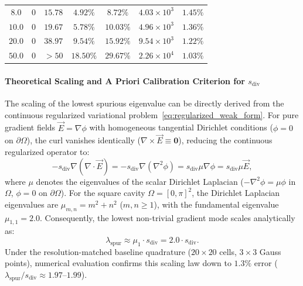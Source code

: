 \documentclass[preprint,12pt]{elsarticle}
\begin{document}
\begin{table}[!htbp]
{\begin{tabular}{@{} c c c c c c c @{}}
            $8.0$              & $0$                         & $15.78$                                         & $4.92\%$                                        & $8.72\%$                                     & $4.03 \times 10^3$              & $1.45\%$               \\
            $10.0$             & $0$                         & $19.67$                                         & $5.78\%$                                        & $10.03\%$                                    & $4.96 \times 10^3$              & $1.36\%$               \\
            $20.0$             & $0$                         & $38.97$                                         & $9.54\%$                                        & $15.92\%$                                    & $9.54 \times 10^3$              & $1.22\%$               \\
            $50.0$             & $0$                         & $> 50$                                          & $18.50\%$                                       & $29.67\%$                                    & $2.26 \times 10^4$              & $1.03\%$               \\
            \bottomrule
        \end{tabular}%
    }
\end{table}

\paragraph{Theoretical Scaling and A Priori Calibration Criterion for $s_{\mathrm{div}}$}
The scaling of the lowest spurious eigenvalue can be directly derived from the continuous regularized variational problem~\eqref{eq:regularized_weak_form}. For pure gradient fields $\vec{E} = \nabla\phi$ with homogeneous tangential Dirichlet conditions ($\phi = 0$ on $\partial\Omega$), the curl vanishes identically ($\nabla \times \vec{E} \equiv \mathbf{0}$), reducing the continuous regularized operator to:
\begin{equation}
    -s_{\mathrm{div}}\nabla(\nabla \cdot \vec{E}) = -s_{\mathrm{div}}\nabla(\nabla^2\phi) = s_{\mathrm{div}}\mu \nabla\phi = s_{\mathrm{div}}\mu \vec{E},
    \label{eq:analytical_spurious_scaling}
\end{equation}
where $\mu$ denotes the eigenvalues of the scalar Dirichlet Laplacian ($-\nabla^2\phi = \mu\phi$ in $\Omega$, $\phi=0$ on $\partial\Omega$). For the square cavity $\Omega = [0, \pi]^2$, the Dirichlet Laplacian eigenvalues are $\mu_{m,n} = m^2 + n^2$ ($m,n \ge 1$), with the fundamental eigenvalue $\mu_{1,1} = 2.0$. Consequently, the lowest non-trivial gradient mode scales analytically as:
\begin{equation}
    \lambda_{\mathrm{spur}} \approx \mu_1 \cdot s_{\mathrm{div}} = 2.0 \cdot s_{\mathrm{div}}.
    \label{eq:spurious_eigenvalue_estimate}
\end{equation}
Under the resolution-matched baseline quadrature ($20 \times 20$ cells, $3 \times 3$ Gauss points), numerical evaluation confirms this scaling law down to $1.3\%$ error ($\lambda_{\mathrm{spur}}/s_{\mathrm{div}} \approx 1.97\text{--}1.99$).
\end{document}
